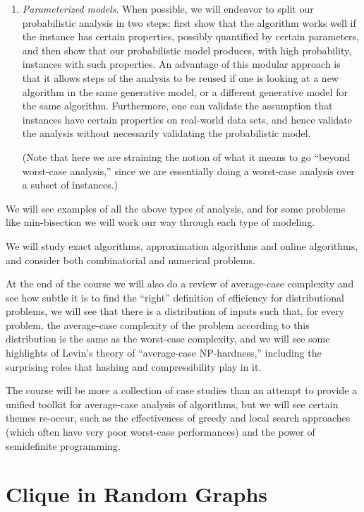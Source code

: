 \begin{enumerate}
\item {\em Parameterized models}. When possible, we will endeavor to split our probabilistic analysis in two steps: first show that the algorithm works well if the instance has certain properties, possibly quantified by certain parameters, and then show that our probabilistic model produces, with high probability, instances with such properties. An advantage of this modular approach is that it allows steps of the analysis to be reused if one is looking at a new algorithm in the same generative model, or a different generative model for the same algorithm. Furthermore, one can validate the assumption that instances have certain properties on real-world data sets, and hence validate the analysis without necessarily validating the probabilistic model.

(Note that here we are straining the notion of what it means to go ``beyond worst-case analysis,'' since we are essentially doing a worst-case analysis over a subset of instances.)

\end{enumerate}

We will see examples of all the above types of analysis, and for some problems like min-bisection we will work our way through each type of modeling. 

We will study exact algorithms, approximation algorithms and online algorithms, and consider both combinatorial and numerical problems.

At the end of the course we will also do a review of average-case complexity and see how subtle it is to find the ``right'' definition of efficiency for distributional problems, we will see that there is a distribution of inputs such that, for every problem, the average-case complexity of the problem according to this distribution is the same as the worst-case complexity, and we will see some highlights of Levin's theory of ``average-case NP-hardness,'' including the surprising roles that hashing and compressibility play in it.

The course will be more a collection of case studies than an attempt to provide a unified toolkit for average-case analysis of algorithms, but we will see certain themes re-occur, such as the effectiveness of greedy and local search approaches (which often have very poor worst-case performances) and the power of semidefinite programming.


\section{Clique in Random Graphs}

